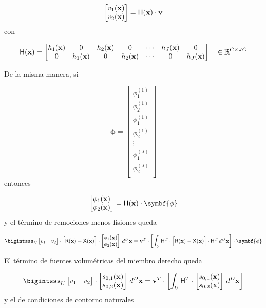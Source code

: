 \documentclass[
  12pt,
  a4paper,
  table]{scrbook}
\theoremstyle{plain}
\theoremstyle{definition}
\theoremstyle{plain}
\theoremstyle{plain}
\theoremstyle{remark}
\begin{document}
\[
\begin{bmatrix}
 v_1(\mathbf{x}) \\ v_2(\mathbf{x})
\end{bmatrix}
=
\mathsf{H}(\mathbf{x})
\cdot
\mathbf{v}
\] con

\[
\mathsf{H}(\mathbf{x}) =
\begin{bmatrix}
h_1(\mathbf{x}) & 0 & h_2(\mathbf{x}) & 0 & \cdots & h_J(\mathbf{x}) & 0 \\
0 & h_1(\mathbf{x}) & 0 & h_2(\mathbf{x}) & \cdots & 0 & h_J(\mathbf{x}) \\
\end{bmatrix} \quad \in \mathbb{R}^{G \times JG}
\]

De la misma manera, si

\[
\symbf{\phi} =
\begin{bmatrix}
 \phi_1^{(1)} \\ \phi_2^{(1)} \\
 \phi_1^{(1)} \\ \phi_2^{(1)} \\
\vdots \\
 \phi_1^{(J)} \\ \phi_2^{(J)} \\
\end{bmatrix}
\] entonces

\[
\begin{bmatrix}
 \phi_1(\vec{x}) \\ \phi_2(\vec{x})
\end{bmatrix}
=
\mat{H}(\vec{x})
\cdot
\symbf{\phi}
\] y el término de remociones menos fisiones queda

\[
\bigintsss_U
\begin{bmatrix}
 v_1 & v_2
\end{bmatrix}
\cdot
\Big[\mat{R}(\vec{x}) - \mat{X}(\vec{x})\Big]
\cdot
\begin{bmatrix}
 \phi_1(\vec{x}) \\
 \phi_2(\vec{x}) \\
\end{bmatrix}
\, d^D\vec{x}
=
\vec{v}^T
\cdot
\left[
\int_U
\mat{H}^T
\cdot
\Big[\mat{R}(\vec{x}) - \mat{X}(\vec{x})\Big]
\cdot
\mat{H}^T
\, d^D\vec{x}
\right]
\cdot
\symbf{\phi}
\]

El término de fuentes volumétricas del miembro derecho queda

\[
\bigintsss_U
\begin{bmatrix}
 v_1 & v_2
\end{bmatrix}
\cdot
\begin{bmatrix}
 s_{0,1}(\vec{x}) \\
 s_{0,2}(\vec{x}) \\
\end{bmatrix}
\, d^D\vec{x}
=
\vec{v}^T
\cdot
\left[
\int_U
\mat{H}^T
\cdot
\begin{bmatrix}
 s_{0,1}(\vec{x}) \\
 s_{0,2}(\vec{x}) \\
\end{bmatrix}
\, d^D\vec{x}
\right]
\] y el de condiciones de contorno naturales
\end{document}
